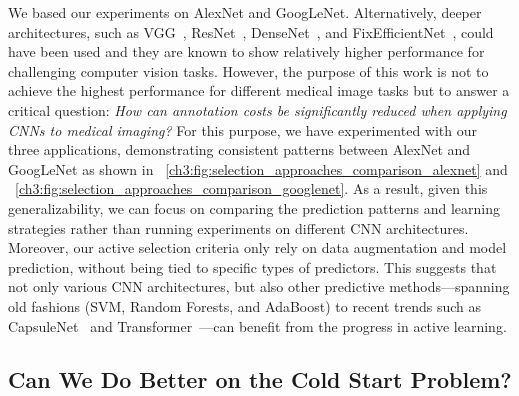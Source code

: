 We based our experiments on AlexNet and GoogLeNet. Alternatively, deeper architectures, such as VGG~\citep{simonyan2014very}, ResNet~\citep{he2016deep}, DenseNet~\citep{huang2017densely}, and FixEfficientNet~\citep{touvron2020fixing}, could have been used and they are known to show relatively higher performance for challenging computer vision tasks.
However, the purpose of this work is not to achieve the highest performance for different medical image tasks but to answer a critical question: {\em How can annotation costs be significantly reduced when applying CNNs to medical imaging?} For this purpose, we have experimented with our three applications, demonstrating consistent patterns between AlexNet and GoogLeNet as shown in \figurename~\ref{ch3:fig:selection_approaches_comparison_alexnet} and \figurename~\ref{ch3:fig:selection_approaches_comparison_googlenet}. As a result, given this generalizability, we can focus on comparing the prediction patterns and learning strategies rather than running experiments on different CNN architectures. Moreover, our active selection criteria only rely on data augmentation and model prediction, without being tied to specific types of predictors. This suggests that not only various CNN architectures, but also other predictive methods---spanning old fashions (\eg SVM, Random Forests, and AdaBoost) to recent trends such as CapsuleNet~\citep{sabour2017dynamic} and Transformer~\citep{dosovitskiy2020image}---can benefit from the progress in active learning.

\subsection{Can We Do Better on the Cold Start Problem?}
\label{ch3:discussion_conclusion:cold_start_problem}

